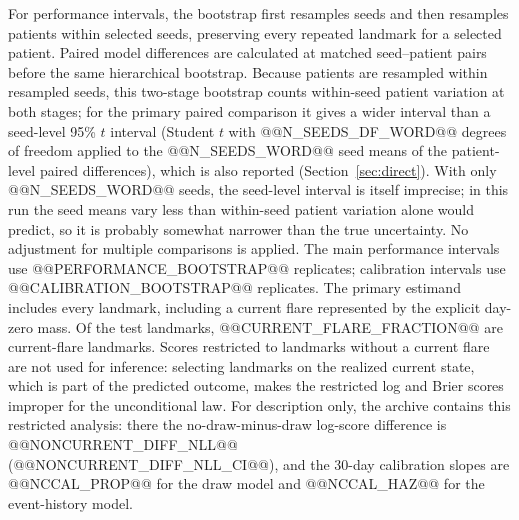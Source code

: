 \documentclass{ieeeaccess}
\begin{document}
For performance intervals, the bootstrap first resamples seeds and then resamples patients within selected seeds, preserving every repeated landmark for a selected patient. Paired model differences are calculated at matched seed--patient pairs before the same hierarchical bootstrap. Because patients are resampled within resampled seeds, this two-stage bootstrap counts within-seed patient variation at both stages; for the primary paired comparison it gives a wider interval than a seed-level 95\% $t$ interval (Student $t$ with @@N_SEEDS_DF_WORD@@ degrees of freedom applied to the @@N_SEEDS_WORD@@ seed means of the patient-level paired differences), which is also reported (Section~\ref{sec:direct}). With only @@N_SEEDS_WORD@@ seeds, the seed-level interval is itself imprecise; in this run the seed means vary less than within-seed patient variation alone would predict, so it is probably somewhat narrower than the true uncertainty. No adjustment for multiple comparisons is applied. The main performance intervals use @@PERFORMANCE_BOOTSTRAP@@ replicates; calibration intervals use @@CALIBRATION_BOOTSTRAP@@ replicates. The primary estimand includes every landmark, including a current flare represented by the explicit day-zero mass. Of the test landmarks, @@CURRENT_FLARE_FRACTION@@ are current-flare landmarks. Scores restricted to landmarks without a current flare are not used for inference: selecting landmarks on the realized current state, which is part of the predicted outcome, makes the restricted log and Brier scores improper for the unconditional law. For description only, the archive contains this restricted analysis: there the no-draw-minus-draw log-score difference is @@NONCURRENT_DIFF_NLL@@ (@@NONCURRENT_DIFF_NLL_CI@@), and the 30-day calibration slopes are @@NCCAL_PROP@@ for the draw model and @@NCCAL_HAZ@@ for the event-history model.
\end{document}
